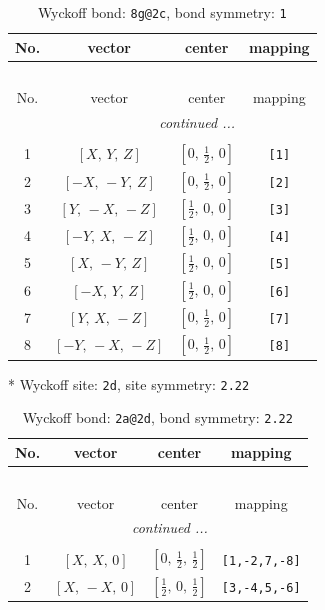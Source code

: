 \documentclass[fleqn,8pt]{jsarticle}
\begin{document}
\begin{longtable}{cccc}
\caption{Wyckoff bond: {\tt 8g@2c}, bond symmetry: {\tt 1}}
 \\
 \hline \hline
No. & vector & center & mapping \\ \hline \endfirsthead

\multicolumn{3}{l}{\tablename\ \thetable{}} \\
 \hline \hline
No. & vector & center & mapping \\ \hline \endhead

 \hline \hline
\multicolumn{3}{r}{\footnotesize\it continued ...} \\ \endfoot

 \hline \hline
\multicolumn{3}{r}{} \\ \endlastfoot

1 & $\left[ X,\, Y,\, Z \right]$ & $\left[ 0,\, \frac{1}{2},\, 0 \right]$ & {\tt [1]} \\ \hline
2 & $\left[ - X,\, - Y,\, Z \right]$ & $\left[ 0,\, \frac{1}{2},\, 0 \right]$ & {\tt [2]} \\ \hline
3 & $\left[ Y,\, - X,\, - Z \right]$ & $\left[ \frac{1}{2},\, 0,\, 0 \right]$ & {\tt [3]} \\ \hline
4 & $\left[ - Y,\, X,\, - Z \right]$ & $\left[ \frac{1}{2},\, 0,\, 0 \right]$ & {\tt [4]} \\ \hline
5 & $\left[ X,\, - Y,\, Z \right]$ & $\left[ \frac{1}{2},\, 0,\, 0 \right]$ & {\tt [5]} \\ \hline
6 & $\left[ - X,\, Y,\, Z \right]$ & $\left[ \frac{1}{2},\, 0,\, 0 \right]$ & {\tt [6]} \\ \hline
7 & $\left[ Y,\, X,\, - Z \right]$ & $\left[ 0,\, \frac{1}{2},\, 0 \right]$ & {\tt [7]} \\ \hline
8 & $\left[ - Y,\, - X,\, - Z \right]$ & $\left[ 0,\, \frac{1}{2},\, 0 \right]$ & {\tt [8]} \\
\end{longtable}
* Wyckoff site: {\tt 2d}, site symmetry: {\tt 2.22}
\renewcommand{\arraystretch}{1.2}
\begin{longtable}{cccc}
\caption{Wyckoff bond: {\tt 2a@2d}, bond symmetry: {\tt 2.22}}
 \\
 \hline \hline
No. & vector & center & mapping \\ \hline \endfirsthead

\multicolumn{3}{l}{\tablename\ \thetable{}} \\
 \hline \hline
No. & vector & center & mapping \\ \hline \endhead

 \hline \hline
\multicolumn{3}{r}{\footnotesize\it continued ...} \\ \endfoot

 \hline \hline
\multicolumn{3}{r}{} \\ \endlastfoot

1 & $\left[ X,\, X,\, 0 \right]$ & $\left[ 0,\, \frac{1}{2},\, \frac{1}{2} \right]$ & {\tt [1,-2,7,-8]} \\ \hline
2 & $\left[ X,\, - X,\, 0 \right]$ & $\left[ \frac{1}{2},\, 0,\, \frac{1}{2} \right]$ & {\tt [3,-4,5,-6]} \\
\end{longtable}
\end{document}
